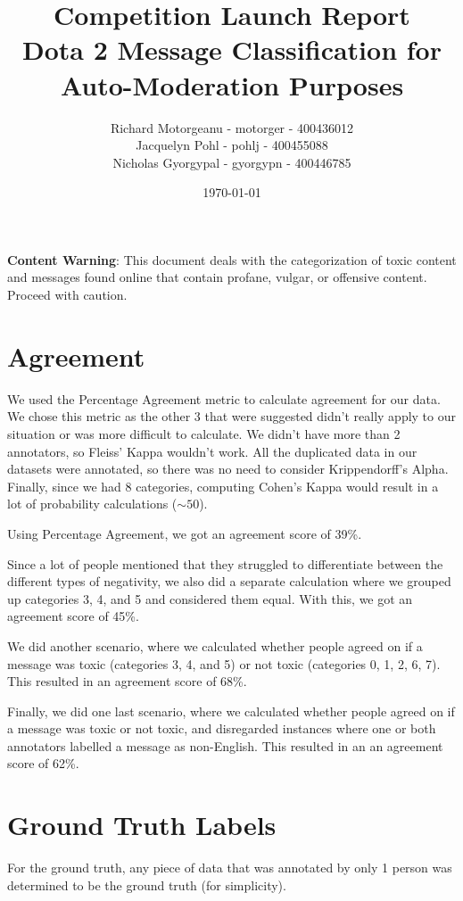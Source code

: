 \documentclass[11pt, letterpaper, notitlepage]{article}
\title{Competition Launch Report \\ Dota 2 Message Classification for Auto-Moderation Purposes}
\author{Richard Motorgeanu - motorger - 400436012\\ Jacquelyn Pohl - pohlj - 400455088\\ Nicholas Gyorgypal - gyorgypn - 400446785}
\date{\today}
\begin{document}
\maketitle


\vspace{12em}

\textbf{Content Warning}: This document deals with the categorization of toxic content and messages found online that contain profane, vulgar, or offensive content. Proceed with caution.

\newpage

\section[1]{Agreement}

We used the Percentage Agreement metric to calculate agreement for our data. We chose this metric as the other 3 that were suggested didn't really apply to our situation or was more difficult to calculate. We didn't have more than 2 annotators, so Fleiss' Kappa wouldn't work. All the duplicated data in our datasets were annotated, so there was no need to consider Krippendorff's Alpha. Finally, since we had 8 categories, computing Cohen's Kappa would result in a lot of probability calculations ($\sim 50$).

Using Percentage Agreement, we got an agreement score of 39\%. 

Since a lot of people mentioned that they struggled to differentiate between the different types of negativity, we also did a separate calculation where we grouped up categories 3, 4, and 5 and considered them equal. With this, we got an agreement score of 45\%.

We did another scenario, where we calculated whether people agreed on if a message was toxic (categories 3, 4, and 5) or not toxic (categories 0, 1, 2, 6, 7). This resulted in an agreement score of 68\%.

Finally, we did one last scenario, where we calculated whether people agreed on if a message was toxic or not toxic, and disregarded instances where one or both annotators labelled a message as non-English. This resulted in an an agreement score of 62\%.

\section[2]{Ground Truth Labels}

For the ground truth, any piece of data that was annotated by only 1 person was determined to be the ground truth (for simplicity).
\end{document}
